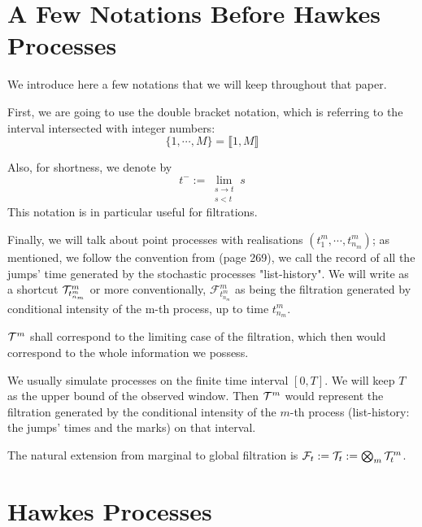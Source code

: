 \section{A Few Notations Before Hawkes Processes}
We introduce here a few notations that we will keep throughout that paper.

First, we are going to use the double bracket notation, which is referring to the interval intersected with integer numbers: 
$$ \{1, \cdots, M\} = \llbracket 1, M \rrbracket $$

Also, for shortness, we denote by $$t^- := \lim_{ \substack{ s \to t \\ s < t}  } s $$ This notation is in particular useful for filtrations.

Finally, we will talk about point processes with realisations $ ( t_{1}^m, \cdots , t_{n_m}^m ) $; as mentioned, we follow the convention from \cite{daley} (page 269), we call the record of all the jumps' time generated by the stochastic processes "list-history".  We will write as a shortcut  $ \mathcal{T}^m_{t_{n_m}^m } $ or more conventionally, $\mathcal F^m_{t_{n_m}^m }$ as being the filtration generated by conditional intensity of the m-th process, up to time $t_{n_m}^m$.

$ \mathcal{T}^m$ shall correspond to the limiting case of the filtration, which then would correspond to the whole information we possess. 

We usually simulate processes on the finite time interval $[0,T]$. We will keep $T$ as the upper bound of the observed window. Then $ \mathcal{T}^m$ would represent the filtration generated by the conditional intensity of the $m$-th process (list-history: the jumps' times and the marks) on that interval.

The natural extension from marginal to global filtration is $\mathcal F_t := \mathcal{T}_t := \bigotimes_m \mathcal{T}^m_t $.

\section{Hawkes Processes}
